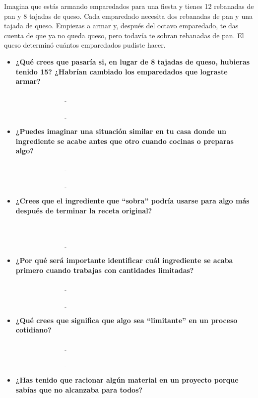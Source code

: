 \documentclass[
  spanish,
  letterpaper,
  12pt,
  oneside,
  open=any]{scrbook}
\begin{document}
Imagina que estás armando emparedados para una fiesta y tienes 12
rebanadas de pan y 8 tajadas de queso. Cada emparedado necesita dos
rebanadas de pan y una tajada de queso. Empiezas a armar y, después del
octavo emparedado, te das cuenta de que ya no queda queso, pero todavía
te sobran rebanadas de pan. El queso determinó cuántos emparedados
pudiste hacer.

\begin{itemize}
\item
  \textbf{¿Qué crees que pasaría si, en lugar de 8 tajadas de queso,
  hubieras tenido 15? ¿Habrían cambiado los emparedados que lograste
  armar?}

  \(\underline{\hspace{6cm}}\)

  \(\underline{\hspace{6cm}}\)
\item
  \textbf{¿Puedes imaginar una situación similar en tu casa donde un
  ingrediente se acabe antes que otro cuando cocinas o preparas algo?}

  \(\underline{\hspace{6cm}}\)

  \(\underline{\hspace{6cm}}\)
\item
  \textbf{¿Crees que el ingrediente que ``sobra'' podría usarse para
  algo más después de terminar la receta original?}

  \(\underline{\hspace{6cm}}\)

  \(\underline{\hspace{6cm}}\)
\item
  \textbf{¿Por qué será importante identificar cuál ingrediente se acaba
  primero cuando trabajas con cantidades limitadas?}

  \(\underline{\hspace{6cm}}\)

  \(\underline{\hspace{6cm}}\)
\item
  \textbf{¿Qué crees que significa que algo sea ``limitante'' en un
  proceso cotidiano?}

  \(\underline{\hspace{6cm}}\)

  \(\underline{\hspace{6cm}}\)
\item
  \textbf{¿Has tenido que racionar algún material en un proyecto porque
  sabías que no alcanzaba para todos?}


\end{itemize}
\end{document}
